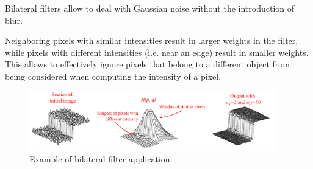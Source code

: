 \begin{description}
        \begin{remark}
            Bilateral filters allow to deal with Gaussian noise without the introduction of blur.
        \end{remark}

        \begin{remark}
            Neighboring pixels with similar intensities result in larger weights in the filter,
            while pixels with different intensities (i.e. near an edge) result in smaller weights.
            This allows to effectively ignore pixels that belong to a different object from being considered when computing the intensity of a pixel.
        \end{remark}

        \begin{figure}[H]
            \centering
            \includegraphics[width=0.95\textwidth]{./img/_bilateral_filter_example.pdf}
            \caption{Example of bilateral filter application}
        \end{figure}
\end{description}